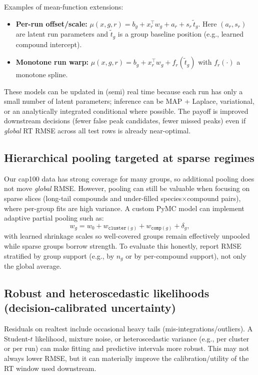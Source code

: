 \documentclass[11pt]{article}
\begin{document}
Examples of mean-function extensions:
\begin{itemize}
  \item \textbf{Per-run offset/scale:} $\mu(x,g,r) = b_g + x_r^\top w_g + a_r + s_r \,\tilde{t}_g$.
        Here $(a_r,s_r)$ are latent run parameters and $\tilde{t}_g$ is a group baseline position (e.g., learned compound intercept).
  \item \textbf{Monotone run warp:} $\mu(x,g,r) = b_g + x_r^\top w_g + f_r(\tilde{t}_g)$ with $f_r(\cdot)$ a monotone spline.
\end{itemize}
These models can be updated in (semi) real time because each run has only a small number of latent parameters; inference can be MAP +
Laplace, variational, or an analytically integrated conditional where possible. The payoff is improved downstream decisions (fewer false
peak candidates, fewer missed peaks) even if \emph{global} RT RMSE across all test rows is already near-optimal.

\subsection{Hierarchical pooling targeted at sparse regimes}

Our cap100 data has strong coverage for many groups, so additional pooling does not move \emph{global} RMSE. However, pooling can still
be valuable when focusing on sparse slices (long-tail compounds and under-filled species$\times$compound pairs), where per-group fits are
high variance. A custom PyMC model can implement adaptive partial pooling such as:
\[
  w_g = w_0 + w_{\texttt{cluster}(g)} + w_{\texttt{comp}(g)} + \delta_g,
\]
with learned shrinkage scales so well-covered groups remain effectively unpooled while sparse groups borrow strength.
To evaluate this honestly, report RMSE stratified by group support (e.g., by $n_g$ or by per-compound support), not only the global
average.

\subsection{Robust and heteroscedastic likelihoods (decision-calibrated uncertainty)}

Residuals on realtest include occasional heavy tails (mis-integrations/outliers). A Student-$t$ likelihood, mixture noise, or
heteroscedastic variance (e.g., per cluster or per run) can make fitting and predictive intervals more robust.
This may not always lower RMSE, but it can materially improve the calibration/utility of the RT window used downstream.
\end{document}
